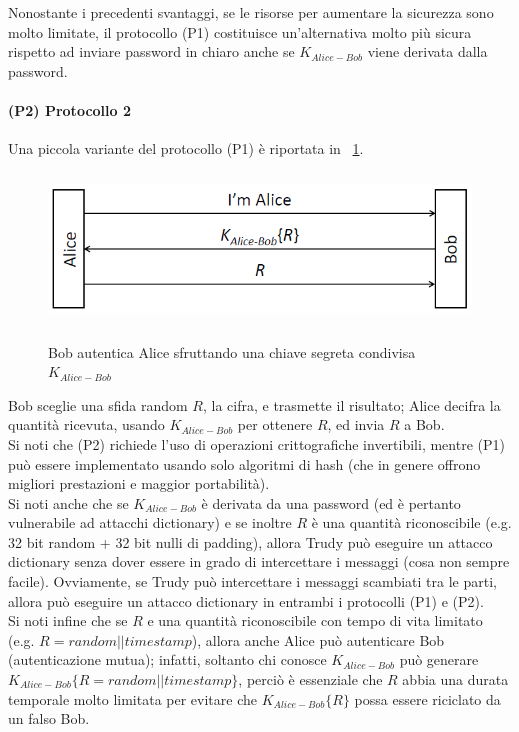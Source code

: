 Nonostante i precedenti svantaggi, se le risorse per aumentare la sicurezza sono molto limitate, il protocollo (P1) costituisce un'alternativa molto più sicura rispetto ad inviare password in chiaro anche se $K_{Alice-Bob}$ viene derivata dalla password.
\paragraph{(P2) Protocollo 2}
Una piccola variante del protocollo (P1) è riportata in \figurename~\ref{fig:ImgS17bis}.
\begin{figure}[htbp]
	\centering%
	\subfigure%
	{\includegraphics[height=4cm, width=12cm, keepaspectratio]{Immagini/autenticazione/ImgS17bis.png}}
	\caption{Bob autentica Alice sfruttando una chiave segreta condivisa $K_{Alice-Bob}$\label{fig:ImgS17bis}} 	
\end{figure}
Bob sceglie una sfida random $R$, la cifra, e trasmette il risultato; Alice decifra la quantità ricevuta, usando $K_{Alice-Bob}$ per ottenere $R$, ed invia $R$ a Bob.\\
Si noti che (P2) richiede l'uso di operazioni crittografiche invertibili, mentre (P1) può essere implementato usando solo algoritmi di hash (che in genere offrono migliori prestazioni e maggior portabilità). \\
Si noti anche che se $K_{Alice-Bob}$ è derivata da una password (ed è pertanto vulnerabile ad attacchi dictionary) e se inoltre $R$ è una quantità riconoscibile (e.g. 32 bit random + 32 bit nulli di padding), allora Trudy può eseguire un attacco dictionary senza dover essere in grado di intercettare i messaggi (cosa non sempre facile). Ovviamente, se Trudy può intercettare i messaggi scambiati tra le parti, allora può eseguire un attacco dictionary in entrambi i
protocolli (P1) e (P2).\\
Si noti infine che se $R$ e una quantità riconoscibile con tempo di vita limitato (e.g. $R = random||timestamp$), allora anche Alice può autenticare Bob (autenticazione mutua); infatti, soltanto chi conosce $K_{Alice-Bob}$ può generare $K_{Alice-Bob}\lbrace R = random||timestamp\rbrace$, perciò è essenziale che $R$ abbia una durata temporale molto limitata per evitare che $K_{Alice-Bob}\lbrace R\rbrace$ possa essere riciclato da un falso Bob.
